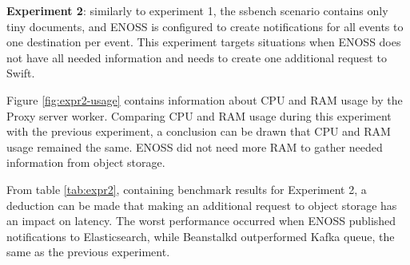     \textbf{Experiment 2}: similarly to experiment 1, the ssbench scenario contains only tiny documents, and ENOSS is configured to create notifications for all events to one destination per event. This experiment targets situations when ENOSS does not have all needed information and needs to create one additional request to Swift.

    Figure \ref{fig:expr2-usage} contains information about CPU and RAM usage by the Proxy server worker. Comparing CPU and RAM usage during this experiment with the previous experiment, a conclusion can be drawn that CPU and RAM usage remained the same. ENOSS did not need more RAM to gather needed information from object storage.

    From table \ref{tab:expr2}, containing benchmark results for Experiment 2, a deduction can be made that making an additional request to object storage has an impact on latency. The worst performance occurred when ENOSS published notifications to Elasticsearch, while Beanstalkd outperformed Kafka queue, the same as the previous experiment.

